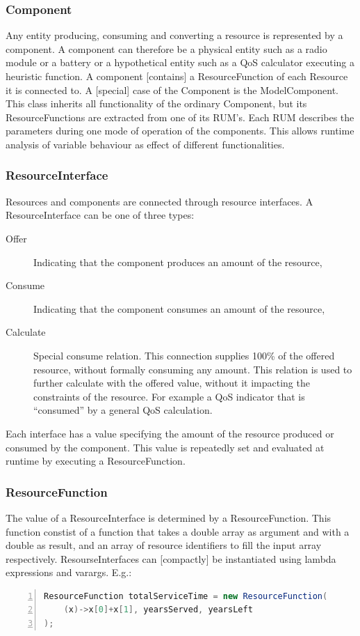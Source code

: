 \subsubsection{Component}
Any entity producing, consuming and converting a resource is represented by a component. A component can therefore be a physical entity such as a radio module or a battery or a hypothetical entity such as a QoS calculator executing a heuristic function. A component [contains] a ResourceFunction of each Resource it is connected to.
A [special] case of the Component is the ModelComponent. This class inherits all functionality of the ordinary Component, but its ResourceFunctions are extracted from one of its RUM's. Each RUM describes the parameters during one mode of operation of the components. This allows runtime analysis of variable behaviour as effect of different functionalities.

\subsubsection{ResourceInterface}
Resources and components are connected through resource interfaces. A ResourceInterface can be one of three types:
\begin{description}
\item[Offer] Indicating that the component produces an amount of the resource,
\item[Consume] Indicating that the component consumes an amount of the resource,
\item[Calculate] Special consume relation. This connection supplies 100\% of the offered resource, without formally consuming any amount. This relation is used to further calculate with the offered value, without it impacting the constraints of the resource. For example a QoS indicator that is ``consumed'' by a general QoS calculation.
\end{description}
Each interface has a value specifying the amount of the resource produced or consumed by the component. This value is repeatedly set and evaluated at runtime by executing a ResourceFunction.

\subsubsection{ResourceFunction}
The value of a ResourceInterface is determined by a ResourceFunction. This function constist of a function that takes a double array as argument and with a double as result, and an array of resource identifiers to fill the input array respectively. ResourseInterfaces can [compactly] be instantiated using lambda expressions and varargs. E.g.:
\begin{lstlisting}[language=java, frame=single, numbers=left, tabsize=4, basicstyle=\small]
ResourceFunction totalServiceTime = new ResourceFunction(
	(x)->x[0]+x[1], yearsServed, yearsLeft
);
\end{lstlisting}

